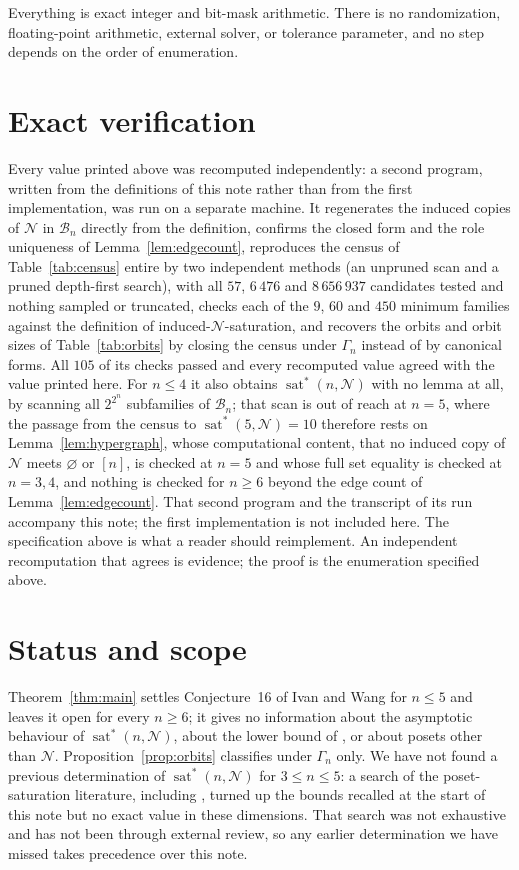 \documentclass[11pt]{amsart}
\newcommand{\Bn}{\mathcal B_n}
\newcommand{\Nposet}{\mathcal N}
\newcommand{\satstar}{\operatorname{sat}^{*}}
\begin{document}
Everything is exact integer and bit-mask arithmetic. There is no randomization,
floating-point arithmetic, external solver, or tolerance parameter, and no step
depends on the order of enumeration.

\section*{Exact verification}

Every value printed above was recomputed independently: a second program,
written from the definitions of this note rather than from the first
implementation, was run on a separate machine. It regenerates the induced
copies of $\Nposet$ in $\Bn$ directly from the definition, confirms the closed
form and the role uniqueness of Lemma~\ref{lem:edgecount}, reproduces the
census of Table~\ref{tab:census} entire by two independent methods (an
unpruned scan and a pruned depth-first search), with all $57$, $6\,476$ and
$8\,656\,937$ candidates tested and nothing sampled or truncated, checks each
of the $9$, $60$ and $450$ minimum families against the definition of
induced-$\Nposet$-saturation, and recovers the orbits and orbit sizes of
Table~\ref{tab:orbits} by closing the census under $\Gamma_n$ instead of by
canonical forms. All $105$ of its checks passed and every recomputed value
agreed with the value printed here. For $n\leq 4$ it also obtains
$\satstar(n,\Nposet)$ with no lemma at all, by scanning all $2^{2^n}$
subfamilies of $\Bn$; that scan is out of reach at $n=5$, where the passage
from the census to $\satstar(5,\Nposet)=10$ therefore rests on
Lemma~\ref{lem:hypergraph}, whose computational content, that no induced copy
of $\Nposet$ meets $\varnothing$ or $[n]$, is checked at $n=5$ and whose full
set equality is checked at $n=3,4$, and nothing is checked for $n\geq 6$
beyond the edge count of Lemma~\ref{lem:edgecount}. That second program and
the transcript of its run accompany this note; the first implementation is
not included here. The
specification above is what a reader should reimplement. An
independent recomputation that agrees is evidence; the proof is the enumeration
specified above.

\section*{Status and scope}

Theorem~\ref{thm:main} settles Conjecture~16 of Ivan and Wang for
$n\leq 5$ and leaves it open for every $n\geq 6$; it gives no information about
the asymptotic behaviour of $\satstar(n,\Nposet)$, about the lower bound of
\cite[Theorem~12]{IvanWang}, or about posets other than $\Nposet$.
Proposition~\ref{prop:orbits} classifies under $\Gamma_n$ only. We have not
found a previous determination of $\satstar(n,\Nposet)$ for $3\leq n\leq 5$:
a search of the poset-saturation literature, including
\cite{FerraraEtAl,IvanWang,MartinVeldt}, turned up the bounds recalled at the
start of this note but no exact value in these dimensions. That search was not
exhaustive and has not been through external review, so any earlier
determination we have missed takes precedence over this note.
\end{document}
